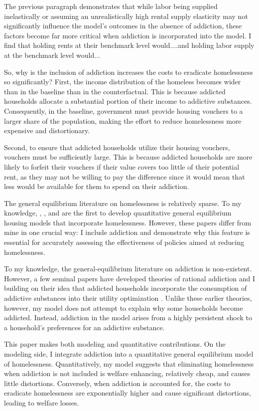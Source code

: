 \documentclass[parskip=full]{article}
\begin{document}
The previous paragraph demonstrates that while labor being supplied inelastically or assuming an unrealistically high rental supply elasticity may not significantly influence the model’s outcomes in the absence of addiction, these factors become far more critical when addiction is incorporated into the model. I find that holding rents at their benchmark level would....and holding labor supply at the benchmark level would...

So, why is the inclusion of addiction increases the costs to eradicate homelessness so significantly? First, the income distribution of the homeless becomes wider than in the baseline than in the counterfactual. This is because addicted households allocate a substantial portion of their income to addictive substances. Consequently, in the baseline, government must provide housing vouchers to a larger share of the population, making the effort to reduce homelessness more expensive and distortionary.

Second, to ensure that addicted households utilize their housing vouchers, vouchers must be sufficiently large. This is because addicted households are more likely to forfeit their vouchers if their value covers too little of their potential rent, as they may not be willing to pay the difference since it would mean that less would be available for them to spend on their addiction.

The general equilibrium literature on homelessness is relatively sparse. To my knowledge, \citet{az-2024}, \citet{abramson-2024}, and \cite{rz-2024} are the first to develop quantitative general equilibrium housing models that incorporate homelessness. However, these papers differ from mine in one crucial way: I include addiction and demonstrate why this feature is essential for accurately assessing the effectiveness of policies aimed at reducing homelessness. 

To my knowledge, the general-equilibrium literature on addiction is non-existent. However, a few seminal papers have developed theories of rational addiction and I building on their idea that addicted households incorporate the consumption of addictive substances into their utility optimization \citep{becker-stigler-1977,becker-murphy-1988}. Unlike these earlier theories, however, my model does not attempt to explain why some households become addicted. Instead, addiction in the model arises from a highly persistent shock to a household's preferences for an addictive substance.

This paper makes both modeling and quantitative contributions. On the modeling side, I integrate addiction into a quantitative general equilibrium model of homelessness. Quantitatively, my model suggests that eliminating homelessness when addiction is not included is welfare enhancing, relatively cheap, and causes little distortions. Conversely, when addiction is accounted for, the costs to eradicate homelessness are exponentially higher and cause significant distortions, leading to welfare losses.
\end{document}
